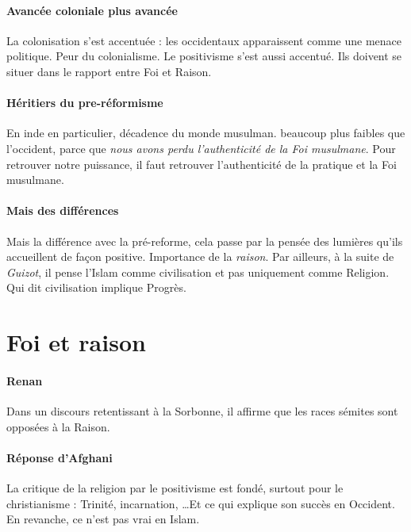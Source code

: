     \paragraph{Avancée coloniale plus avancée} La colonisation s'est accentuée : les occidentaux apparaissent comme une menace politique. Peur du colonialisme. Le positivisme s'est aussi accentué. Ils doivent se situer dans le rapport entre Foi et Raison. 
   
   \paragraph{Héritiers du pre-réformisme} En inde en particulier, décadence du monde musulman. beaucoup plus faibles que l'occident, parce que \textit{nous avons perdu l'authenticité de la Foi musulmane}. Pour retrouver notre puissance, il faut retrouver l'authenticité de la pratique et la Foi musulmane.
   
   \paragraph{Mais des différences} Mais la différence avec la pré-reforme, cela passe par la pensée des lumières qu'ils accueillent de façon positive. Importance de la \textit{raison}. Par ailleurs, à la suite de \textit{Guizot}, il pense l'Islam comme civilisation et pas uniquement comme Religion. Qui dit civilisation implique Progrès. 
   
  
  \section{Foi et raison}
  
 \paragraph{Renan } Dans un discours retentissant à la Sorbonne, il affirme que les races sémites sont opposées à la Raison.
 
 \paragraph{Réponse d'Afghani} La critique de la religion par le positivisme est fondé, surtout pour le christianisme : Trinité, incarnation, \ldots Et ce qui explique son succès en Occident. En revanche, ce n'est pas vrai en Islam.
 

